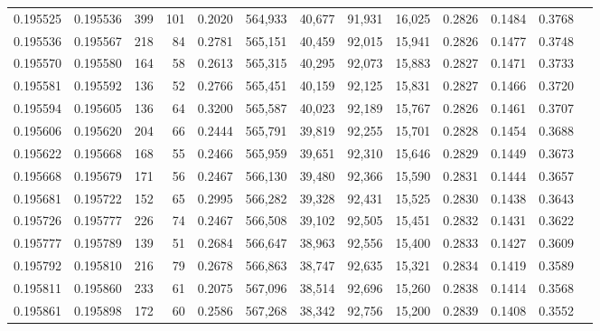 \begin{tabular}{rrrrrrrrrrrrr}
0.195525 & 0.195536 &   399 & 101 &                                     0.2020 & 564,933 &  40,677 &  91,931 &  16,025 & 0.2826 & 0.1484 & 0.3768 \\
0.195536 & 0.195567 &   218 &  84 &                                     0.2781 & 565,151 &  40,459 &  92,015 &  15,941 & 0.2826 & 0.1477 & 0.3748 \\
0.195570 & 0.195580 &   164 &  58 &                                     0.2613 & 565,315 &  40,295 &  92,073 &  15,883 & 0.2827 & 0.1471 & 0.3733 \\
0.195581 & 0.195592 &   136 &  52 &                                     0.2766 & 565,451 &  40,159 &  92,125 &  15,831 & 0.2827 & 0.1466 & 0.3720 \\
0.195594 & 0.195605 &   136 &  64 &                                     0.3200 & 565,587 &  40,023 &  92,189 &  15,767 & 0.2826 & 0.1461 & 0.3707 \\
0.195606 & 0.195620 &   204 &  66 &                                     0.2444 & 565,791 &  39,819 &  92,255 &  15,701 & 0.2828 & 0.1454 & 0.3688 \\
0.195622 & 0.195668 &   168 &  55 &                                     0.2466 & 565,959 &  39,651 &  92,310 &  15,646 & 0.2829 & 0.1449 & 0.3673 \\
0.195668 & 0.195679 &   171 &  56 &                                     0.2467 & 566,130 &  39,480 &  92,366 &  15,590 & 0.2831 & 0.1444 & 0.3657 \\
0.195681 & 0.195722 &   152 &  65 &                                     0.2995 & 566,282 &  39,328 &  92,431 &  15,525 & 0.2830 & 0.1438 & 0.3643 \\
0.195726 & 0.195777 &   226 &  74 &                                     0.2467 & 566,508 &  39,102 &  92,505 &  15,451 & 0.2832 & 0.1431 & 0.3622 \\
0.195777 & 0.195789 &   139 &  51 &                                     0.2684 & 566,647 &  38,963 &  92,556 &  15,400 & 0.2833 & 0.1427 & 0.3609 \\
0.195792 & 0.195810 &   216 &  79 &                                     0.2678 & 566,863 &  38,747 &  92,635 &  15,321 & 0.2834 & 0.1419 & 0.3589 \\
0.195811 & 0.195860 &   233 &  61 &                                     0.2075 & 567,096 &  38,514 &  92,696 &  15,260 & 0.2838 & 0.1414 & 0.3568 \\
0.195861 & 0.195898 &   172 &  60 &                                     0.2586 & 567,268 &  38,342 &  92,756 &  15,200 & 0.2839 & 0.1408 & 0.3552 \\

\end{tabular}
